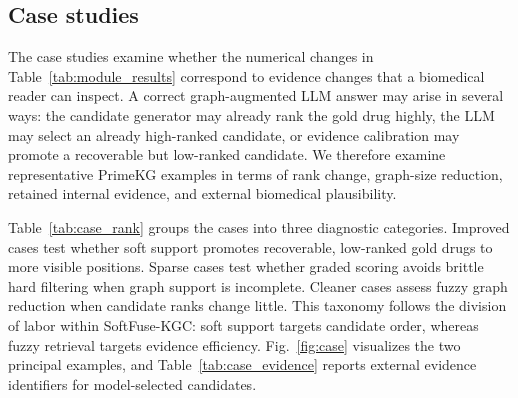 \documentclass[pdflatex,sn-mathphys-num]{sn-jnl}
\newcommand{\figref}[1]{Fig.~\ref{#1}}
\newcommand{\tabref}[1]{Table~\ref{#1}}
\newcommand{\softfuse}{SoftFuse-KGC}
\begin{document}
\subsection{Case studies}

The case studies examine whether the numerical changes in \tabref{tab:module_results} correspond to evidence changes that a biomedical reader can inspect. A correct graph-augmented LLM answer may arise in several ways: the candidate generator may already rank the gold drug highly, the LLM may select an already high-ranked candidate, or evidence calibration may promote a recoverable but low-ranked candidate. We therefore examine representative PrimeKG examples in terms of rank change, graph-size reduction, retained internal evidence, and external biomedical plausibility.

\tabref{tab:case_rank} groups the cases into three diagnostic categories. Improved cases test whether soft support promotes recoverable, low-ranked gold drugs to more visible positions. Sparse cases test whether graded scoring avoids brittle hard filtering when graph support is incomplete. Cleaner cases assess fuzzy graph reduction when candidate ranks change little. This taxonomy follows the division of labor within \softfuse{}: soft support targets candidate order, whereas fuzzy retrieval targets evidence efficiency. \figref{fig:case} visualizes the two principal examples, and \tabref{tab:case_evidence} reports external evidence identifiers for model-selected candidates.
\end{document}
